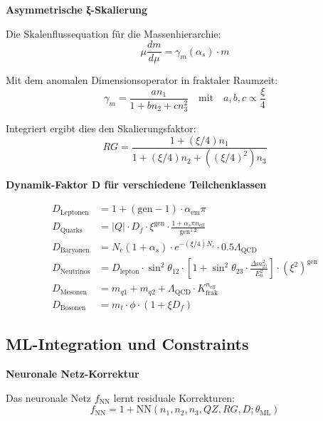 	\textbf{Asymmetrische ξ-Skalierung}
	
	Die Skalenflussequation für die Massenhierarchie:
	\begin{equation}
		\mu \frac{dm}{d\mu} = \gamma_m(\alpha_s) \cdot m
	\end{equation}
	
	Mit dem anomalen Dimensionsoperator in fraktaler Raumzeit:
	\begin{equation}
		\gamma_m = \frac{a n_1}{1 + b n_2 + c n_3^2} \quad \text{mit} \quad a,b,c \propto \frac{\xi}{4}
	\end{equation}
	
	Integriert ergibt dies den Skalierungsfaktor:
	\begin{equation}
		RG = \frac{1 + (\xi/4) n_1}{1 + (\xi/4) n_2 + ((\xi/4)^2) n_3}
	\end{equation}
	
	\textbf{Dynamik-Faktor D für verschiedene Teilchenklassen}
	
	\begin{align}
		D_{\text{Leptonen}} &= 1 + (\text{gen} - 1) \cdot \alpha_{\text{em}} \pi \\
		D_{\text{Quarks}} &= |Q| \cdot D_f \cdot \xi^{\text{gen}} \cdot \frac{1 + \alpha_s \pi n_{\text{eff}}}{\text{gen}^{1.2}} \\
		D_{\text{Baryonen}} &= N_c (1 + \alpha_s) \cdot e^{-(\xi/4) N_c} \cdot 0.5 \Lambda_{\text{QCD}} \\
		D_{\text{Neutrinos}} &= D_{\text{lepton}} \cdot \sin^2 \theta_{12} \cdot \left[1 + \sin^2 \theta_{23} \cdot \frac{\Delta m^2_{21}}{E_0^2}\right] \cdot (\xi^2)^{\text{gen}} \\
		D_{\text{Mesonen}} &= m_{q1} + m_{q2} + \Lambda_{\text{QCD}} \cdot K_{\text{frak}}^{n_{\text{eff}}} \\
		D_{\text{Bosonen}} &= m_t \cdot \phi \cdot (1 + \xi D_f)
	\end{align}
	
	\subsection{ML-Integration und Constraints}
	
	\textbf{Neuronale Netz-Korrektur}
	
	Das neuronale Netz $f_{\text{NN}}$ lernt residuale Korrekturen:
	\begin{equation}
		f_{\text{NN}} = 1 + \text{NN}(n_1, n_2, n_3, QZ, RG, D; \theta_{\text{ML}})
	\end{equation}
	
